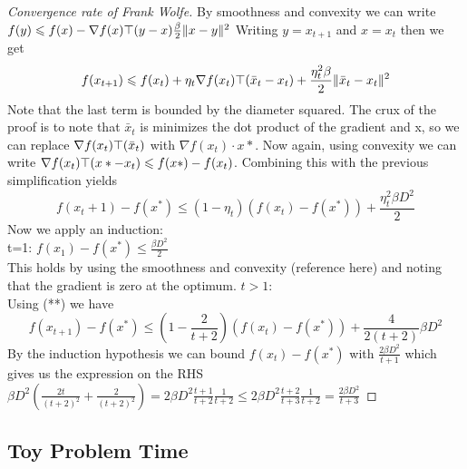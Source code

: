 \documentclass[12pt]{article}
\begin{document}
\begin{proof}[Convergence rate of Frank Wolfe]
By smoothness and convexity we can write $f(y) \leqslant f(x) - \nabla f(x)\top(y-x) \frac{\beta}{2} \|x - y\|^2$
Writing $y=x_{t+1}$ and $x= x_t$ then we get 
\begin{equation}
f(x_{t+1}) \leqslant f(x_t) + \eta_t \nabla f(x_t)\top(\bar{x}_t - x_t) + \frac{\eta_t^2 \beta}{2} \|\bar{x}_t - x_t \|^2
\end{equation}
Note that the last term is bounded by the diameter squared. The crux of the proof is to note that $\bar{x}_t$ is minimizes the dot product of the gradient and x, so we can replace $\nabla f(x_t)\top(\bar{x}_t)$ with $\nabla f(x_t)\cdot x*$.
Now again, using convexity we can write $\nabla f(x_t)\top(x* - x_t) \leqslant f(x*) - f(x_t)$. Combining this with the previous simplification yields
\begin{equation}
f(x_t+1) - f(x^*) \leq (1-\eta _t)(f(x_t) - f(x^*)) + \frac{\eta_t^2 \beta D^2}{2}
\end{equation}
Now we apply an induction: \\
 t=1: $f(x_1) - f(x^*) \leq \frac{\beta D^2}{2}$ \\
 This holds by using the smoothness and convexity (reference here) and noting that the gradient is zero at the optimum. 
 $t > 1$: \\
 Using (**) we have 
 \begin{equation}
 f\left(x_{t+1}\right) - f\left(x^*\right) \leq \left(1-\frac{2}{t+2}\right)\left(f\left(x_t\right) - f\left(x^*\right)\right) + \frac{4}{2(t+2)}\beta D^2
 \end{equation}
 By the induction hypothesis we can bound $f(x_t) - f(x^*)$ with $\frac{2\beta D^2}{t+1}$ which gives us the expression on the RHS $\beta D^2(\frac{2t}{(t+2)^2} + \frac{2}{(t+2)^2}) = 2\beta D^2 \frac{t+1}{t+2}\frac{1}{t+2} \leq 2 \beta D^2 \frac{t+2}{t+3}\frac{1}{t+2} = \frac{2\beta D^2}{t+3}$ 
\end{proof}

\subsection{Toy Problem Time}
\end{document}
